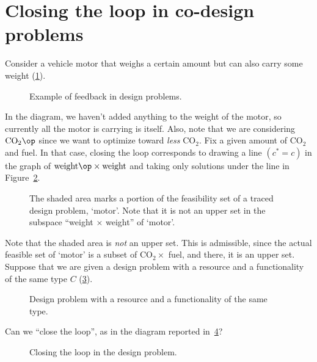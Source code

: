 \section{Closing the loop in co-design problems}
\begin{example}Consider a vehicle motor that weighs a certain amount but can also carry some weight (\cref{fig:examplefeedback}).
\begin{figure}[h!]
\begin{center}
\end{center}
\caption{Example of feedback in design problems. \label{fig:examplefeedback}}
\end{figure}
In the diagram, we haven't added anything to the weight of the motor, so currently all the motor is carrying is itself. Also, note that we are considering $\text{CO}_2\op$ since we want to optimize toward \emph{less} CO$_2$. Fix a given amount of CO$_2$ and fuel. In that case, closing the loop corresponds to drawing a line $(c^\ast = c)$ in the graph of $\text{weight}\op \times \text{weight}$ and taking only solutions under the line in Figure~\ref{fig:weightcarrier}.
\begin{figure}[h!]
\centering
{}
\caption{The shaded area marks a portion of the feasibility set of a traced design problem, `motor'. Note that it is not an upper set in the subspace ``weight $\times$ weight'' of `motor'.}
\label{fig:weightcarrier}
\end{figure}
\end{example}

Note that the shaded area is \emph{not} an upper set. This is admissible, since the actual feasible set of `motor' is a subset of CO$_2 \times$ fuel, and there, it is an upper set.
Suppose that we are given a design problem with a resource and a functionality of the same type $C$ (\cref{fig:extrace_1}).

\begin{figure}[h!]
\begin{center}
\end{center}
\caption{Design problem with a resource and a functionality of the same type. \label{fig:extrace_1}}
\end{figure}

Can we ``close the loop'', as in the diagram reported in~\cref{fig:extrace_2}?
\begin{figure}[h!]
\begin{center}
\end{center}
\caption{Closing the loop in the design problem. \label{fig:extrace_2}}
\end{figure}

